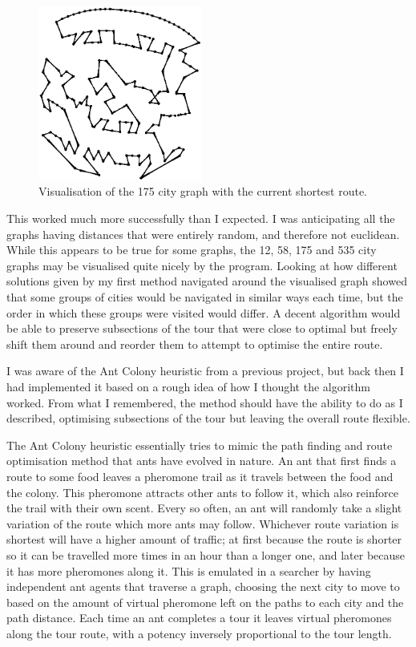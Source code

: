 \documentclass[a4paper,11pt]{article}
\begin{document}
\begin{figure}
\includegraphics[width=0.48\textwidth]{175vis}
\caption{Visualisation of the 175 city graph with the current shortest route.}
\end{figure}

This worked much more successfully than I expected. I was anticipating all the
graphs having distances that were entirely random, and therefore not euclidean.
While this appears to be true for some graphs, the 12, 58, 175 and 535 city
graphs may be visualised quite nicely by the program. Looking at how different
solutions given by my first method navigated around the visualised graph showed
that some groups of cities would be navigated in similar ways each time, but
the order in which these groups were visited would differ. A decent algorithm
would be able to preserve subsections of the tour that were close to optimal
but freely shift them around and reorder them to attempt to optimise the entire
route.

I was aware of the Ant Colony heuristic from a previous project, but back then
I had implemented it based on a rough idea of how I thought the algorithm
worked. From what I remembered, the method should have the ability to do as I
described, optimising subsections of the tour but leaving the overall route
flexible.

The Ant Colony heuristic essentially tries to mimic the path finding and route
optimisation method that ants have evolved in nature. An ant that first finds a
route to some food leaves a pheromone trail as it travels between the food and
the colony. This pheromone attracts other ants to follow it, which also
reinforce the trail with their own scent. Every so often, an ant will randomly
take a slight variation of the route which more ants may follow. Whichever
route variation is shortest will have a higher amount of traffic; at first
because the route is shorter so it can be travelled more times in an hour than
a longer one, and later because it has more pheromones along it. This is
emulated in a searcher by having independent ant agents that traverse a graph,
choosing the next city to move to based on the amount of virtual pheromone left
on the paths to each city and the path distance. Each time an ant completes a
tour it leaves virtual pheromones along the tour route, with a potency 
inversely proportional to the tour length.
\end{document}
